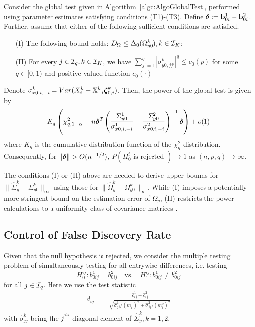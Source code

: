 \begin{theorem}\label{thm:PowerThm}
Consider the global test given in Algorithm~\ref{algo:AlgoGlobalTest}, performed using parameter estimates satisfying conditions (T1)-(T3). Define ${\boldsymbol{\delta}} := {\bf{b}}_{0 i}^1 - {\bf{b}}_{0 i}^2$. Further, assume that either of the following sufficient conditions are satisfied.

\begin{itemize}
\item[(I)] The following bound holds: $D_\Omega \leq \Delta_0 (\Omega_{y0}^k), k \in {\cal{I}}_K$;

\item[(II)] For every $j \in {\cal{I}}_q, k \in {\cal{I}}_K$, we have
$
\sum_{j' = 1}^q | \sigma_{y0,jj'}^k |^q \leq c_0 (p)
$ for some $q \in [0,1)$ and positive-valued function $c_0(\cdot)$.
\end{itemize}

Denote $\sigma_{x0,i,-i}^k = Var( X_i^k - {\mathbb{X}}_{-i}^k {\boldsymbol{\zeta}}_{0,i}^k)$. Then, the power of the global test is given by
%
$$
K_q \left( \chi^2_{q,1-\alpha} + n {\boldsymbol{\delta}}^T 
\left( \frac{ \Sigma_{y 0}^1}{\sigma_{x0, i,-i}^1} + \frac{\Sigma_{y 0}^2}{\sigma_{x0, i,-i}^2} \right)^{-1} {\boldsymbol{\delta}} \right) + o(1)
$$
%
where $K_q$ is the cumulative distribution function of the $\chi^2_q$ distribution. Consequently, for $\| {\boldsymbol{\delta}} \| > O(n^{-1/2})$, $P( H_0^i \text{ is rejected }) \rightarrow 1$ as $(n,p,q) \rightarrow \infty$.
\end{theorem}

The conditions (I) or (II) above are needed to derive upper bounds for $\| \widehat \Sigma_y^k - \Sigma_{y0}^k \|_\infty$ using those for $\| \widehat \Omega_y^k - \Omega_{y0}^k \|_\infty$. While (I) imposes a potentially more stringent bound on the estimation error of $\Omega_y$, (II) restricts the power calculations to a uniformity class of covariance matrices \citep{BickelLevina08,CaiLiuLuo12}.
%

\subsection{Control of False Discovery Rate}
Given that the null hypothesis is rejected, we consider the multiple testing problem of simultaneously testing for all entrywise differences, i.e. testing
%
$$
H_0^{ij}: b_{0 ij}^1 = b_{0ij}^2 \quad \text{vs.} \quad H_1^{ij}: b_{0 ij}^1 \neq b_{0 ij}^2 
$$
%
for all $j \in {\cal{I}}_q$. Here we use the test statistic
%
\begin{align}\label{eqn:PairwiseStatistic}
d_{ij} &= \frac{\widehat c_{ij}^1 - \widehat c_{ij}^2}{\sqrt{\hat \sigma_{jj}^1/ (m_i^1)^2 + \hat \sigma_{jj}^2/ (m_i^2)^2}}
\end{align}
%
with $\hat \sigma_{jj}^k$ being the $j^{\operatorname*{^{\text{th}}}}$ diagonal element of $\widehat \Sigma_y^k, k = 1,2$.

